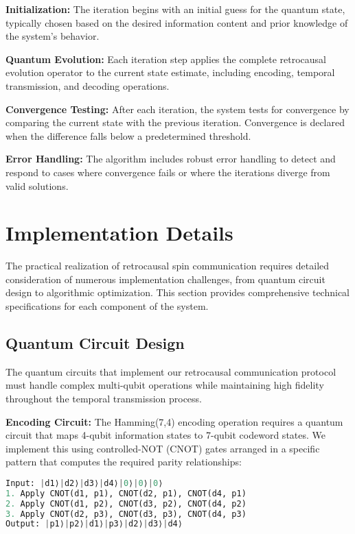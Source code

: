 \documentclass[12pt,a4paper]{article}
\begin{document}
\textbf{Initialization:} The iteration begins with an initial guess for the quantum state, typically chosen based on the desired information content and prior knowledge of the system's behavior.

\textbf{Quantum Evolution:} Each iteration step applies the complete retrocausal evolution operator to the current state estimate, including encoding, temporal transmission, and decoding operations.

\textbf{Convergence Testing:} After each iteration, the system tests for convergence by comparing the current state with the previous iteration. Convergence is declared when the difference falls below a predetermined threshold.

\textbf{Error Handling:} The algorithm includes robust error handling to detect and respond to cases where convergence fails or where the iterations diverge from valid solutions.

\section{Implementation Details}

The practical realization of retrocausal spin communication requires detailed consideration of numerous implementation challenges, from quantum circuit design to algorithmic optimization. This section provides comprehensive technical specifications for each component of the system.

\subsection{Quantum Circuit Design}

The quantum circuits that implement our retrocausal communication protocol must handle complex multi-qubit operations while maintaining high fidelity throughout the temporal transmission process.

\textbf{Encoding Circuit:} The Hamming(7,4) encoding operation requires a quantum circuit that maps 4-qubit information states to 7-qubit codeword states. We implement this using controlled-NOT (CNOT) gates arranged in a specific pattern that computes the required parity relationships:

\begin{lstlisting}[language=Python, caption=Encoding Circuit Structure]
Input: |d1⟩|d2⟩|d3⟩|d4⟩|0⟩|0⟩|0⟩
1. Apply CNOT(d1, p1), CNOT(d2, p1), CNOT(d4, p1)
2. Apply CNOT(d1, p2), CNOT(d3, p2), CNOT(d4, p2)  
3. Apply CNOT(d2, p3), CNOT(d3, p3), CNOT(d4, p3)
Output: |p1⟩|p2⟩|d1⟩|p3⟩|d2⟩|d3⟩|d4⟩
\end{lstlisting}
\end{document}
